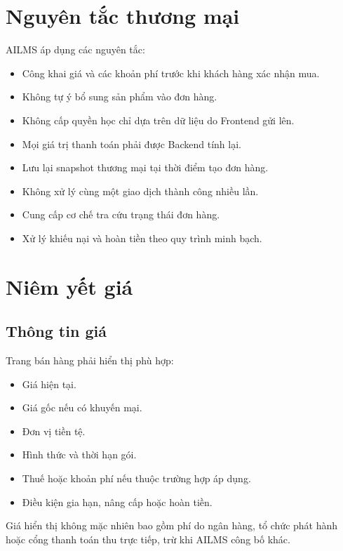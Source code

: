 \documentclass[12pt,a4paper]{article}
\begin{document}
\section{Nguyên tắc thương mại}

AILMS áp dụng các nguyên tắc:

\begin{itemize}
    \item Công khai giá và các khoản phí trước khi khách hàng xác nhận mua.
    \item Không tự ý bổ sung sản phẩm vào đơn hàng.
    \item Không cấp quyền học chỉ dựa trên dữ liệu do Frontend gửi lên.
    \item Mọi giá trị thanh toán phải được Backend tính lại.
    \item Lưu lại snapshot thương mại tại thời điểm tạo đơn hàng.
    \item Không xử lý cùng một giao dịch thành công nhiều lần.
    \item Cung cấp cơ chế tra cứu trạng thái đơn hàng.
    \item Xử lý khiếu nại và hoàn tiền theo quy trình minh bạch.
\end{itemize}

\section{Niêm yết giá}

\subsection{Thông tin giá}

Trang bán hàng phải hiển thị phù hợp:

\begin{itemize}
    \item Giá hiện tại.
    \item Giá gốc nếu có khuyến mại.
    \item Đơn vị tiền tệ.
    \item Hình thức và thời hạn gói.
    \item Thuế hoặc khoản phí nếu thuộc trường hợp áp dụng.
    \item Điều kiện gia hạn, nâng cấp hoặc hoàn tiền.
\end{itemize}

Giá hiển thị không mặc nhiên bao gồm phí do ngân hàng,
tổ chức phát hành hoặc cổng thanh toán thu trực tiếp,
trừ khi AILMS công bố khác.
\end{document}
